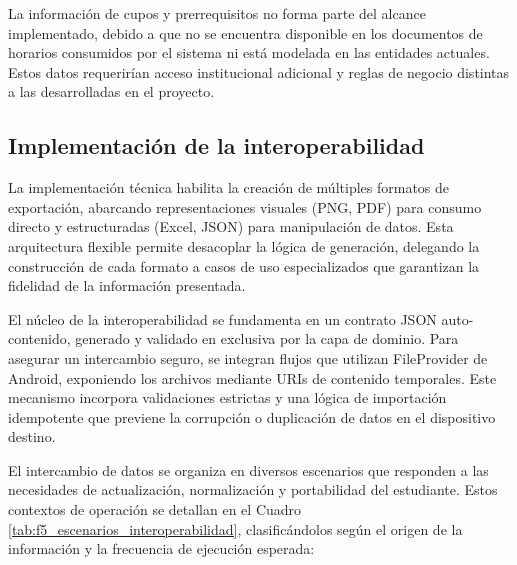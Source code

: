 La información de cupos y prerrequisitos no forma parte del alcance implementado, debido a que no se encuentra disponible en los documentos de horarios consumidos por el sistema ni está modelada en las entidades actuales. Estos datos requerirían acceso institucional adicional y reglas de negocio distintas a las desarrolladas en el proyecto.

\subsection{Implementación de la interoperabilidad}
La implementación técnica habilita la creación de múltiples formatos de exportación, abarcando representaciones visuales (PNG, PDF) para consumo directo y estructuradas (Excel, JSON) para manipulación de datos. Esta arquitectura flexible permite desacoplar la lógica de generación, delegando la construcción de cada formato a casos de uso especializados que garantizan la fidelidad de la información presentada.

El núcleo de la interoperabilidad se fundamenta en un contrato JSON auto-contenido, generado y validado en exclusiva por la capa de dominio. Para asegurar un intercambio seguro, se integran flujos que utilizan FileProvider de Android, exponiendo los archivos mediante URIs de contenido temporales. Este mecanismo incorpora validaciones estrictas y una lógica de importación idempotente que previene la corrupción o duplicación de datos en el dispositivo destino.

El intercambio de datos se organiza en diversos escenarios que responden a las necesidades de actualización, normalización y portabilidad del estudiante. Estos contextos de operación se detallan en el Cuadro \ref{tab:f5_escenarios_interoperabilidad}, clasificándolos según el origen de la información y la frecuencia de ejecución esperada:

